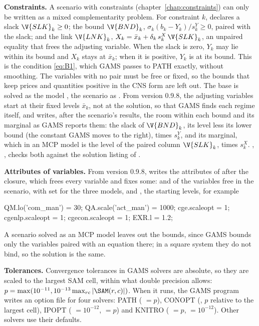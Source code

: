 \textbf{Constraints.} A scenario with constraints
(chapter~\ref{chap:constraints}) can only be written as a mixed complementarity
problem. For constraint $k$,  declares a slack
$\V{SLK}_k \ge 0$; the bound $\V{BND}_k$, $\sigma_k(b_k - Y_k)/s^Y_k \ge 0$,
paired with the slack; and the link $\V{LNK}_k$,
$X_k = \bar x_k + \delta_k\,s^X_k\,\V{SLK}_k$, an unpaired equality that frees
the adjusting variable. When the slack is zero, $Y_k$ may lie within its bound
and $X_k$ stays at $\bar x_k$; when it is positive, $Y_k$ is at its bound. This
is the condition \eqref{eq:B1}, which GAMS passes to PATH exactly, without
smoothing. The variables with no pair must be free or fixed, so the bounds that
keep prices and quantities positive in the CNS form are left out. The base is
solved as the model , the scenario as . From version
0.9.8, the adjusting variables start at their fixed levels $\bar x_k$, not at
the solution, so that GAMS finds each regime itself, and
 writes, after the scenario's results, the room
within each bound and its marginal as GAMS reports them: the slack of
$\V{BND}_k$, its level less its lower bound (the constant GAMS moves to the
right), times $s^Y_k$, and its marginal, which in an MCP model is the level of
the paired column $\V{SLK}_k$, times $s^X_k$. , ,
checks both against the solution listing of .

\textbf{Attributes of variables.} From version 0.9.8, 
writes the attributes of  after the closure, which frees
every variable and fixes some:  and  of the variables free in
the scenario,  with  set for the three models, and
, the starting levels, for example
\begin{filecode}
QM.lo('com_man') = 30;
QA.scale('act_man') = 1000;
cge.scaleopt = 1;  cgenlp.scaleopt = 1;  cgecon.scaleopt = 1;
EXR.l = 1.2;
\end{filecode}
A scenario solved as an MCP model leaves out the bounds, since GAMS bounds
only the variables paired with an equation there; in a square system they do
not bind, so the solution is the same.

\textbf{Tolerances.} Convergence tolerances in GAMS solvers are absolute, so
they are scaled to the largest SAM cell, within what double precision allows:
$p = \max(10^{-11}, 10^{-13} \max_{rc} |\SAM(r, c)|)$. When it runs, the GAMS
program writes an option file for four solvers: PATH ( $= p$), CONOPT
(, $p$ relative to the largest cell), IPOPT ( $= 10^{-12}$,
 $= p$) and KNITRO ( $= p$,
 $= 10^{-12}$). Other solvers use their defaults.

